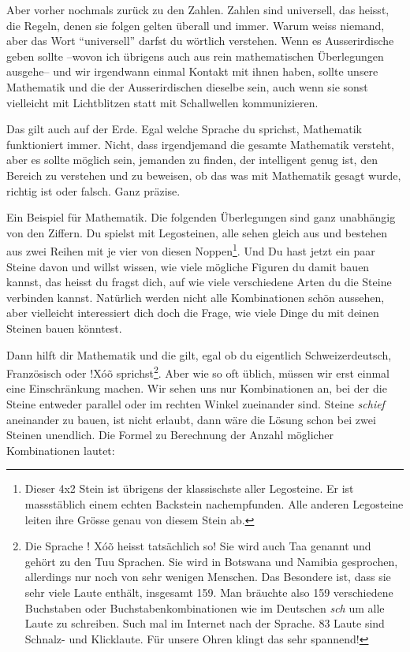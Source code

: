Aber vorher nochmals zurück zu den Zahlen. Zahlen sind universell, das heisst, die Regeln, denen sie folgen gelten überall und immer. Warum weiss niemand, aber das Wort \enquote{universell} darfst du wörtlich verstehen. Wenn es Ausserirdische geben sollte --wovon ich übrigens auch aus rein mathematischen Überlegungen ausgehe-- und wir irgendwann einmal Kontakt mit ihnen haben, sollte unsere Mathematik und die der Ausserirdischen dieselbe sein, auch wenn sie sonst vielleicht mit Lichtblitzen statt mit Schallwellen kommunizieren.

Das gilt auch auf der Erde. Egal welche Sprache du sprichst, Mathematik funktioniert immer. Nicht, dass irgendjemand die gesamte Mathematik versteht, aber es sollte möglich sein, jemanden zu finden, der intelligent genug ist, den Bereich zu verstehen und zu beweisen, ob das was mit Mathematik gesagt wurde, richtig ist oder falsch. Ganz präzise.

Ein Beispiel für Mathematik. Die folgenden Überlegungen sind ganz unabhängig von den Ziffern. Du spielst mit Legosteinen, alle sehen gleich aus und bestehen aus zwei Reihen mit je vier von diesen Noppen\footnote{Dieser 4x2 Stein ist übrigens der klassischste aller Legosteine. Er ist massstäblich einem echten Backstein nachempfunden. Alle anderen Legosteine leiten ihre Grösse genau von diesem Stein ab.}. Und Du hast jetzt ein paar Steine davon und willst wissen, wie viele mögliche Figuren du damit bauen kannst, das heisst du fragst dich, auf wie viele verschiedene Arten du die Steine verbinden kannst. Natürlich werden nicht alle Kombinationen schön aussehen, aber vielleicht interessiert dich doch die Frage, wie viele Dinge du mit deinen Steinen bauen könntest.

Dann hilft dir Mathematik und die gilt, egal ob du eigentlich Schweizerdeutsch, Französisch oder $!$X\'{o}\~{o} sprichst\footnote{Die Sprache ǃ X\'{o}\~{o} heisst tatsächlich so! Sie wird auch Taa genannt und gehört zu den Tuu Sprachen. Sie wird in Botswana und Namibia gesprochen, allerdings nur noch von sehr wenigen Menschen. Das Besondere ist, dass sie sehr viele Laute enthält, insgesamt 159. Man bräuchte also 159 verschiedene Buchstaben oder Buchstabenkombinationen wie im Deutschen \textit{sch} um alle Laute zu schreiben. Such mal im Internet nach der Sprache. 83 Laute sind Schnalz- und Klicklaute. Für unsere Ohren klingt das sehr spannend!}. Aber wie so oft üblich, müssen wir erst einmal eine Einschränkung machen. Wir sehen uns nur Kombinationen an, bei der die Steine entweder parallel oder im rechten Winkel zueinander sind. Steine \textit{schief} aneinander zu bauen, ist nicht erlaubt, dann wäre die Lösung schon bei zwei Steinen unendlich. Die Formel zu Berechnung der Anzahl möglicher Kombinationen lautet:

